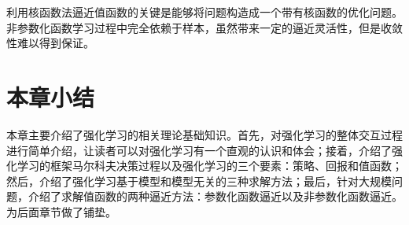 利用核函数法逼近值函数的关键是能够将问题构造成一个带有核函数的优化问题。非参数化函数学习过程中完全依赖于样本，虽然带来一定的逼近灵活性，但是收敛性难以得到保证。

\section{本章小结}
 本章主要介绍了强化学习的相关理论基础知识。首先，对强化学习的整体交互过程进行简单介绍，让读者可以对强化学习有一个直观的认识和体会；接着，介绍了强化学习的框架马尔科夫决策过程以及强化学习的三个要素：策略、回报和值函数；然后，介绍了强化学习基于模型和模型无关的三种求解方法；最后，针对大规模问题，介绍了求解值函数的两种逼近方法：参数化函数逼近以及非参数化函数逼近。为后面章节做了铺垫。